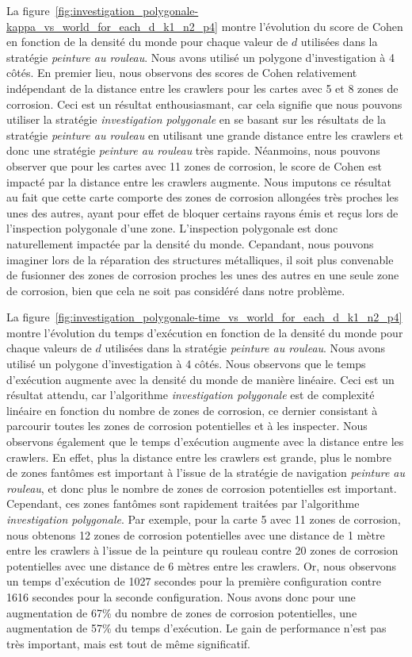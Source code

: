 \documentclass[francais,RandD]{rapportPFE}
\begin{document}
			La figure~\ref{fig:investigation_polygonale-kappa_vs_world_for_each_d_k1_n2_p4} montre l'évolution du score de Cohen en fonction de la densité du monde pour chaque valeur de $d$ utilisées dans la stratégie \textit{peinture au rouleau}.
			Nous avons utilisé un polygone d'investigation à 4 côtés.
			En premier lieu, nous observons des scores de Cohen relativement indépendant de la distance entre les crawlers pour les cartes avec 5 et 8 zones de corrosion.
			Ceci est un résultat enthousiasmant, car cela signifie que nous pouvons utiliser la stratégie \textit{investigation polygonale} en se basant sur les résultats de la stratégie \textit{peinture au rouleau} en utilisant une grande distance entre les crawlers et donc une stratégie \textit{peinture au rouleau} très rapide.
			Néanmoins, nous pouvons observer que pour les cartes avec 11 zones de corrosion, le score de Cohen est impacté par la distance entre les crawlers augmente.
			Nous imputons ce résultat au fait que cette carte comporte des zones de corrosion allongées très proches les unes des autres, ayant pour effet de bloquer certains rayons émis et reçus lors de l'inspection polygonale d'une zone.
			L'inspection polygonale est donc naturellement impactée par la densité du monde.
			Cepandant, nous pouvons imaginer lors de la réparation des structures métalliques, il soit plus convenable de fusionner des zones de corrosion proches les unes des autres en une seule zone de corrosion, bien que cela ne soit pas considéré dans notre problème.

			La figure~\ref{fig:investigation_polygonale-time_vs_world_for_each_d_k1_n2_p4} montre l'évolution du temps d'exécution en fonction de la densité du monde pour chaque valeurs de $d$ utilisées dans la stratégie \textit{peinture au rouleau}.
			Nous avons utilisé un polygone d'investigation à 4 côtés.
			Nous observons que le temps d'exécution augmente avec la densité du monde de manière linéaire.
			Ceci est un résultat attendu, car l'algorithme \textit{investigation polygonale} est de complexité linéaire en fonction du nombre de zones de corrosion, ce dernier consistant à parcourir toutes les zones de corrosion potentielles et à les inspecter.
			Nous observons également que le temps d'exécution augmente avec la distance entre les crawlers.
			En effet, plus la distance entre les crawlers est grande, plus le nombre de zones fantômes est important à l'issue de la stratégie de navigation \textit{peinture au rouleau}, et donc plus le nombre de zones de corrosion potentielles est important.
			Cependant, ces zones fantômes sont rapidement traitées par l'algorithme \textit{investigation polygonale}.
			Par exemple, pour la carte 5 avec 11 zones de corrosion, nous obtenons 12 zones de corrosion potentielles avec une distance de 1 mètre entre les crawlers à l'issue de la peinture qu rouleau contre 20 zones de corrosion potentielles avec une distance de 6 mètres entre les crawlers.
			Or, nous observons un temps d'exécution de 1027 secondes pour la première configuration contre 1616 secondes pour la seconde configuration.
			Nous avons donc pour une augmentation de 67\% du nombre de zones de corrosion potentielles, une augmentation de 57\% du temps d'exécution.
			Le gain de performance n'est pas très important, mais est tout de même significatif.
\end{document}
